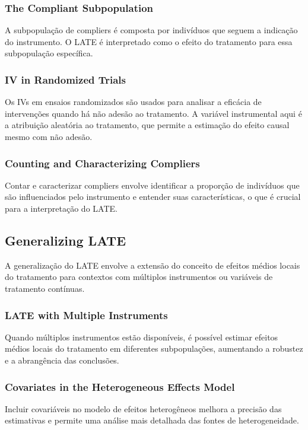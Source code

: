\documentclass[a4paper,12pt]{article}[abntex2]
\begin{document}
\subsubsection{The Compliant Subpopulation}
A subpopulação de compliers é composta por indivíduos que seguem a indicação do instrumento. O LATE é interpretado como o efeito do tratamento para essa subpopulação específica.

\subsubsection{IV in Randomized Trials}
Os IVs em ensaios randomizados são usados para analisar a eficácia de intervenções quando há não adesão ao tratamento. A variável instrumental aqui é a atribuição aleatória ao tratamento, que permite a estimação do efeito causal mesmo com não adesão.

\subsubsection{Counting and Characterizing Compliers}
Contar e caracterizar compliers envolve identificar a proporção de indivíduos que são influenciados pelo instrumento e entender suas características, o que é crucial para a interpretação do LATE.

\subsection{Generalizing LATE}
A generalização do LATE envolve a extensão do conceito de efeitos médios locais do tratamento para contextos com múltiplos instrumentos ou variáveis de tratamento contínuas.

\subsubsection{LATE with Multiple Instruments}
Quando múltiplos instrumentos estão disponíveis, é possível estimar efeitos médios locais do tratamento em diferentes subpopulações, aumentando a robustez e a abrangência das conclusões.

\subsubsection{Covariates in the Heterogeneous Effects Model}
Incluir covariáveis no modelo de efeitos heterogêneos melhora a precisão das estimativas e permite uma análise mais detalhada das fontes de heterogeneidade.
\end{document}
